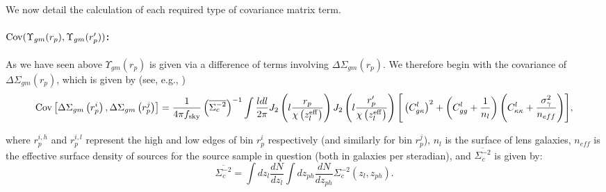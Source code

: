 \documentclass[onecolumn,amsmath,aps,fleqn, superscriptaddress]{revtex4}
\begin{document}
We now detail the calculation of each required type of covariance matrix term.

\vspace{2mm}

\paragraph*{${\rm Cov}(\Upsilon_{gm}(r_p),\Upsilon_{gm}(r_p^\prime))$:} As we have seen above $\Upsilon_{gm}(r_p)$ is given via a difference of terms involving $\Delta \Sigma_{gm}(r_p)$. We therefore begin with the covariance of $\Delta \Sigma_{gm}(r_p)$, which is given by (see, e.g., \cite{Jeong2009, Singh2016})
\begin{equation}
{\rm Cov}\left[\Delta \Sigma_{gm}\left(r_p^i\right),\Delta \Sigma_{gm}\left(r_p^j\right) \right] = \nonumber \\ \frac{1}{4\pi f_{ \rm sky}} \left(\overline{\Sigma_c^{-2}}\right)^{-1}\int \frac{l dl}{2\pi} J_2\left(l\frac{r_p}{\chi\left(z_{{l}}^{\rm eff}\right)}\right) J_2\left(l\frac{r_p^\prime}{\chi\left(z_{{l}}^{\rm eff}\right)}\right)\Bigg[\left(C_{g\kappa}^{l}\right)^2 + \left(C_{gg}^l+\frac{1}{n_{l}}\right)\Bigg( C_{\kappa\kappa}^l + \frac{\sigma_{\gamma}^2}{n_{eff}} \Bigg)\Bigg],
\label{DeltaSigmaCov}
\end{equation}

where $r_p^{i,h}$ and $r_p^{i,l}$ represent the high and low edges of bin $r_p^i$ respectively (and similarly for bin $r_p^j$), $n_{l}$ is the surface of lens galaxies, $n_{eff}$ is the effective surface density of sources for the source sample in question (both in galaxies per steradian), and $\overline{\Sigma_c^{-2}}$ is given by:
\begin{equation}
\overline{\Sigma_c^{-2}} = \int dz_{l} \frac{dN}{dz_{l}} \int dz_{ph} \frac{dN}{dz_{ph}} \Sigma_c^{-2}(z_{l}, z_{ph}). 
\label{wbar}
\end{equation}
\end{document}
